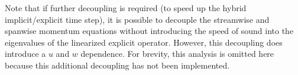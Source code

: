 Note that if further decoupling is required (to speed up the hybrid
implicit/explicit time step), it is possible to decouple the
streamwise and spanwise momentum equations without introducing the
speed of sound into the eigenvalues of the linearized explicit
operator.  However, this decoupling does introduce a $u$ and $w$
dependence.  For brevity, this analysis is omitted here because this
additional decoupling has not been implemented.





